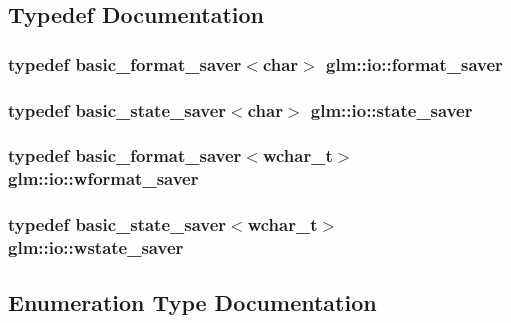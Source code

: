 \subsection{Typedef Documentation}
\hypertarget{namespaceglm_1_1io_afdc168a994ef9e9ca4295578e9097495}{}
\subsubsection[{format\+\_\+saver}]{\setlength{\rightskip}{0pt plus 5cm}typedef {\bf basic\+\_\+format\+\_\+saver}$<$char$>$ {\bf glm\+::io\+::format\+\_\+saver}}\label{namespaceglm_1_1io_afdc168a994ef9e9ca4295578e9097495}
\hypertarget{namespaceglm_1_1io_a84d63ac771c3125d38f144dc15234764}{}
\subsubsection[{state\+\_\+saver}]{\setlength{\rightskip}{0pt plus 5cm}typedef {\bf basic\+\_\+state\+\_\+saver}$<$char$>$ {\bf glm\+::io\+::state\+\_\+saver}}\label{namespaceglm_1_1io_a84d63ac771c3125d38f144dc15234764}
\hypertarget{namespaceglm_1_1io_a6229ca888648a0ff823eb120f61de481}{}
\subsubsection[{wformat\+\_\+saver}]{\setlength{\rightskip}{0pt plus 5cm}typedef {\bf basic\+\_\+format\+\_\+saver}$<$wchar\+\_\+t$>$ {\bf glm\+::io\+::wformat\+\_\+saver}}\label{namespaceglm_1_1io_a6229ca888648a0ff823eb120f61de481}
\hypertarget{namespaceglm_1_1io_a7a46501fc459c05fa3dc0f2bcbf3e92f}{}
\subsubsection[{wstate\+\_\+saver}]{\setlength{\rightskip}{0pt plus 5cm}typedef {\bf basic\+\_\+state\+\_\+saver}$<$wchar\+\_\+t$>$ {\bf glm\+::io\+::wstate\+\_\+saver}}\label{namespaceglm_1_1io_a7a46501fc459c05fa3dc0f2bcbf3e92f}


\subsection{Enumeration Type Documentation}
\hypertarget{namespaceglm_1_1io_a3497781803fe594a37177e05ab2a795f}{}
